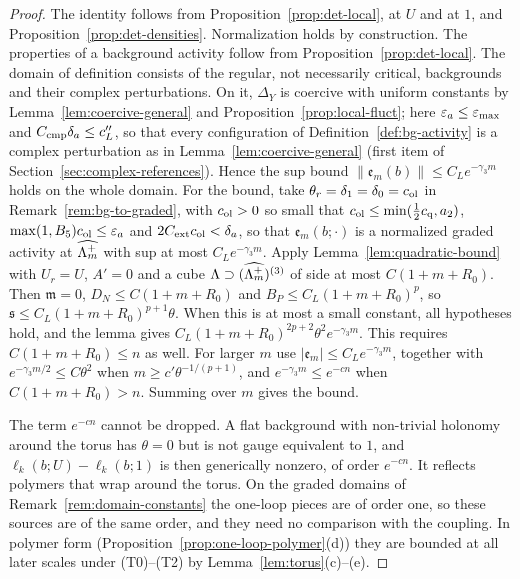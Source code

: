 \begin{proof}
The identity follows from Proposition~\ref{prop:det-local}, at $U$ and at $1$, and Proposition~\ref{prop:det-densities}. Normalization holds by construction. The properties of a background activity follow from Proposition~\ref{prop:det-local}. The domain of definition consists of the regular, not necessarily critical, backgrounds and their complex perturbations. On it, $\Delta_Y$ is coercive with uniform constants by Lemma~\ref{lem:coercive-general} and Proposition~\ref{prop:local-fluct}; here $\varepsilon_a\le\varepsilon_{\max}$ and $C_{\rm cmp}\delta_a\le c''_L$, so that every configuration of Definition~\ref{def:bg-activity} is a complex perturbation as in Lemma~\ref{lem:coercive-general} (first item of Section~\ref{sec:complex-references}). Hence the sup bound $\|\mathfrak e_m(b)\|\le C_Le^{-\gamma_3m}$ holds on the whole domain. For the bound, take $\theta_r=\delta_1=\delta_0=c_{\rm ol}$ in Remark~\ref{rem:bg-to-graded}, with $c_{\rm ol}>0$ so small that $c_{\rm ol}\le\min(\frac12c_{\rm q},a_2)$, $\max(1,B_5)c_{\rm ol}\le\varepsilon_a$ and $2C_{\rm ext}c_{\rm ol}<\delta_a$, so that $\mathfrak e_m(b;\cdot)$ is a normalized graded activity at $\widehat{\Lambda_m^+}$ with sup at most $C_Le^{-\gamma_3m}$. Apply Lemma~\ref{lem:quadratic-bound} with $U_r=U$, $A'=0$ and a cube $\Lambda\supset(\widehat{\Lambda_m^+})^{(3)}$ of side at most $C(1+m+R_0)$. Then $\mathfrak m=0$, $D_N\le C(1+m+R_0)$ and $B_P\le C_L(1+m+R_0)^p$, so $\mathfrak s\le C_L(1+m+R_0)^{p+1}\theta$. When this is at most a small constant, all hypotheses hold, and the lemma gives $C_L(1+m+R_0)^{2p+2}\theta^2e^{-\gamma_3m}$. This requires $C(1+m+R_0)\le n$ as well. For larger $m$ use $|\mathfrak e_m|\le C_Le^{-\gamma_3m}$, together with $e^{-\gamma_3m/2}\le C\theta^2$ when $m\ge c'\theta^{-1/(p+1)}$, and $e^{-\gamma_3m}\le e^{-cn}$ when $C(1+m+R_0)>n$. Summing over $m$ gives the bound.

The term $e^{-cn}$ cannot be dropped. A flat background with non-trivial holonomy around the torus has $\theta=0$ but is not gauge equivalent to $1$, and $\ell_k(b;U)-\ell_k(b;1)$ is then generically nonzero, of order $e^{-cn}$. It reflects polymers that wrap around the torus. On the graded domains of Remark~\ref{rem:domain-constants} the one-loop pieces are of order one, so these sources are of the same order, and they need no comparison with the coupling. In polymer form (Proposition~\ref{prop:one-loop-polymer}(d)) they are bounded at all later scales under (T0)--(T2) by Lemma~\ref{lem:torus}(c)--(e).
\end{proof}

